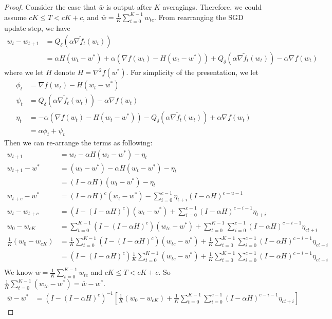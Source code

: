 \begin{proof}
Consider the case that $\bar{w}$ is output after $K$ averagings. Therefore, we could assume $cK \leq T < cK+c$, and $\bar{w}=\frac{1}{K}\sum_{t=0}^{K-1} w_{tc}$.
From rearranging the SGD update step, we have
\begin{align*}
  w_t - w_{t+1}
  &=
  Q_{\delta}\left(\alpha \nabla \tilde f_t(w_t) \right) \\
  &=
  \alpha H (w_t - w^*)
  +
  \alpha \left(
    \nabla f(w_t)
    -
    H (w_t - w^*)
  \right)
  +
  Q_{\delta}\left(\alpha \nabla \tilde f_t(w_t) \right)
  -
  \alpha \nabla f(w_t)
\end{align*}
where we let $H$ denote $H = \nabla^2 f(w^*)$.
For simplicity of the presentation, we let
\begin{align*}
    \phi_t &= \nabla f(w_t) - H ( w_t - w^*) \\
    \psi_t &= Q_\delta(\alpha \nabla \tilde{f}_t(w_t)) - \alpha \nabla f(w_t) \\
    \eta_t &= -\alpha \left(\nabla f(w_t) - H (w_t - w^*) \right)
              - Q_{\delta}\left(\alpha \nabla \tilde f_t(w_t) \right)
              + \alpha \nabla f(w_t) \\
           &= \alpha \phi_t + \psi_t
\end{align*}
Then  we can re-arrange the terms as following:
\begin{align*}
    w_{t+1} &= w_t - \alpha H(w_t - w^*) - \eta_t \\
    w_{t+1} - w^* &= (w_t - w^*) - \alpha H ( w_t - w^* ) - \eta_t \\
                  &= (I - \alpha H) (w_t - w^*) - \eta_t \\
    w_{t+c} - w^* &= (I - \alpha H)^c ( w_t - w^*) - \sum_{i=0}^{c-1} \eta_{t+i}(I-\alpha H)^{c-u-1} \\
    w_t - w_{t+c} &= (I - (I - \alpha H)^c) ( w_t - w^*) + \sum_{i=0}^{c-1}(I - \alpha H)^{c-i-1}\eta_{t+i} \\
    w_0 - w_{cK} &= \sum_{t=0}^{K-1}(I - (I-\alpha H)^c)(w_{tc} - w^*) + \sum_{t=0}^{K-1} \sum_{i=0}^{c-1} (I - \alpha H)^{c-i-1} \eta_{ct+i} \\
    \frac{1}{K}(w_0 - w_{cK}) &= 
        \frac{1}{K}\sum_{t=0}^{K-1}(I - (I-\alpha H)^c)(w_{tc} - w^*) + 
        \frac{1}{K}\sum_{t=0}^{K-1} \sum_{i=0}^{c-1} (I - \alpha H)^{c-i-1} \eta_{ct+i} \\
        &= 
        (I - (I-\alpha H)^c) \frac{1}{K}\sum_{t=0}^{K-1}(w_{tc} - w^*) + 
        \frac{1}{K}\sum_{t=0}^{K-1} \sum_{i=0}^{c-1} (I - \alpha H)^{c-i-1} \eta_{ct+i} \\
\end{align*}
We know $\bar{w} = \frac{1}{K}\sum_{t=0}^{K-1} w_{tc}$ and $cK \leq T < cK+c$. So $\frac{1}{K}\sum_{t=0}^{K-1}(w_{tc} - w^*) = \bar{w} - w^*$. 
\begin{align*}
\bar{w} - w^* &= (I - (I - \alpha H)^c)^{-1} \left[ 
    \frac{1}{K}(w_0 - w_{cK}) + \frac{1}{K}\sum_{t=0}^{K-1}\sum_{i=0}^{c-1} (I-\alpha H)^{c-i-1} \eta_{ct+i}
\right]
\end{align*}


\end{proof}
